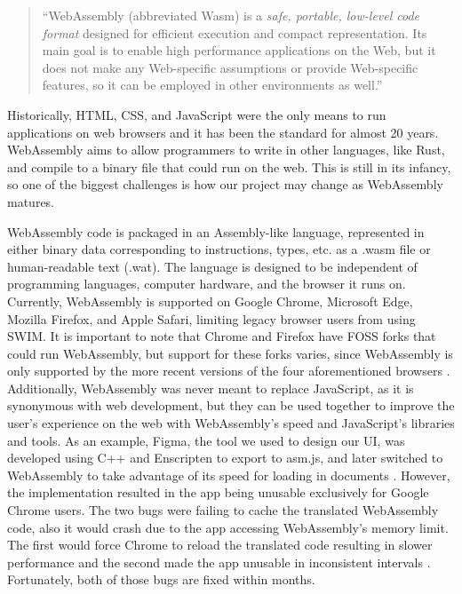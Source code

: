 \documentclass[
    paper=letter,
    parskip=half,
    fontsize=12pt,
    titlepage=firstiscover,
    toc=bibliography,
    numbers=endperiod
]{scrartcl}
\begin{document}
\begin{quote}
    ``WebAssembly (abbreviated Wasm) is a \emph{safe, portable, low-level
        code format} designed for efficient execution and compact
    representation. Its main goal is to enable high performance applications
    on the Web, but it does not make any Web-specific assumptions or provide
    Web-specific features, so it can be employed in other environments as
    well.'' \cite{webassembly-introduction}
\end{quote}

Historically, HTML, CSS, and JavaScript were the only means to run
applications on web browsers and it has been the standard for almost 20
years. WebAssembly aims to allow programmers to write in other
languages, like Rust, and compile to a binary file that could run on the
web. This is still in its infancy, so one of the biggest challenges is
how our project may change as WebAssembly matures.

WebAssembly code is packaged in an Assembly-like language, represented
in either binary data corresponding to instructions, types, etc. as a
.wasm file or human-readable text (.wat). The language is designed to be
independent of programming languages, computer hardware, and the browser
it runs on. Currently, WebAssembly is supported on Google Chrome,
Microsoft Edge, Mozilla Firefox, and Apple Safari, limiting legacy
browser users from using SWIM. It is important to note that Chrome and
Firefox have FOSS forks that could run WebAssembly, but support for
these forks varies, since WebAssembly is only supported by the more
recent versions of the four aforementioned browsers
\cite{mdn-webassembly}. Additionally, WebAssembly was never meant to
replace JavaScript, as it is synonymous with web development, but they
can be used together to improve the user's experience on the web with
WebAssembly's speed and JavaScript's libraries and tools. As an example,
Figma, the tool we used to design our UI, was developed using C++ and
Enscripten to export to asm.js, and later switched to WebAssembly to
take advantage of its speed for loading in documents
\cite{figma-webassembly, madewithwebassembly-figma}. However, the
implementation resulted in the app being unusable exclusively for Google
Chrome users. The two bugs were failing to cache the translated
WebAssembly code, also it would crash due to the app accessing
WebAssembly's memory limit. The first would force Chrome to reload the
translated code resulting in slower performance and the second made the
app unusable in inconsistent intervals \cite{chromium-webassembly-bug1,
    chromium-webassembly-bug2}. Fortunately, both of those bugs are fixed
within months.
\end{document}

